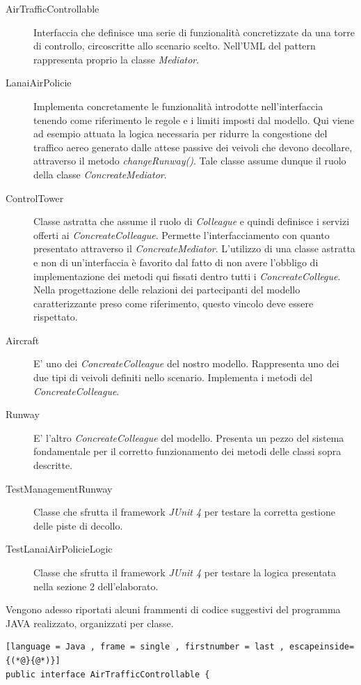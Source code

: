\documentclass{article}
\begin{document}
\begin{sloppy}
\begin{description}
    \item[AirTrafficControllable]Interfaccia che definisce una serie di funzionalità concretizzate da una torre di controllo, circoscritte allo scenario scelto. Nell'UML del pattern rappresenta proprio la classe \textit{Mediator}.
    \item[LanaiAirPolicie]Implementa concretamente le funzionalità introdotte nell'interfaccia tenendo come riferimento le regole e i limiti imposti dal modello. Qui viene ad esempio attuata la logica necessaria per ridurre la congestione del traffico aereo generato dalle attese passive dei veivoli che devono decollare, attraverso il metodo \textit{changeRunway()}. Tale classe assume dunque il ruolo della classe \textit{ConcreateMediator}.
    \item[ControlTower]Classe astratta che assume il ruolo di \textit{Colleague} e quindi definisce i servizi offerti ai \textit{ConcreateColleague}. Permette l'interfacciamento con quanto presentato attraverso il \textit{ConcreateMediator}. L'utilizzo di una classe astratta e non di un'interfaccia è favorito dal fatto di non avere l'obbligo di implementazione dei metodi qui fissati dentro tutti i \textit{ConcreateCollegue}. Nella progettazione delle relazioni dei partecipanti del modello caratterizzante preso come riferimento, questo vincolo deve essere rispettato. 
    \item[Aircraft]E' uno dei \textit{ConcreateColleague} del nostro modello. Rappresenta uno dei due tipi di veivoli definiti nello scenario. Implementa i metodi del \textit{ConcreateColleague}.
    \item[Runway]E' l'altro \textit{ConcreateColleague} del modello. Presenta un pezzo del sistema fondamentale per il corretto funzionamento dei metodi delle classi sopra descritte.
    \item[TestManagementRunway]Classe che sfrutta il framework \textit{JUnit 4} per testare la corretta gestione delle piste di decollo.
    \item[TestLanaiAirPolicieLogic]Classe che sfrutta il framework \textit{JUnit 4} per testare la logica presentata nella sezione 2 dell'elaborato.
\end{description}

Vengono adesso riportati alcuni frammenti di codice suggestivi del programma JAVA realizzato, organizzati per classe.

\bigbreak

\begin{lstlisting}[language = Java , frame = single , firstnumber = last , escapeinside={(*@}{@*)}]
public interface AirTrafficControllable {


\end{lstlisting}
\end{sloppy}
\end{document}
